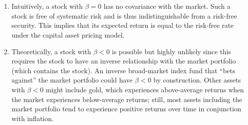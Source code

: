 \documentclass[12pt]{article}
\begin{document}
\section{}
\begin{enumerate}
    \item Intuitively, a stock with $\beta=0$ has no covariance with the market. Such a stock is free of systematic risk and is thus indistinguishable from a risk-free security. This implies that its expected return is equal to the risk-free rate under the capital asset pricing model.
    \item Theoretically, a stock with $\beta<0$ is possible but highly unlikely since this requires the stock to have an inverse relationship with the market portfolio (which contains the stock). An inverse broad-market index fund that ``bets against'' the market portfolio could have $\beta<0$ by construction. Other assets with $\beta<0$ might include gold, which experiences above-average returns when the market experiences below-average returns; still, most assets including the market portfolio tend to experience positive returns over time in conjunction with inflation.
\end{enumerate}
\end{document}
